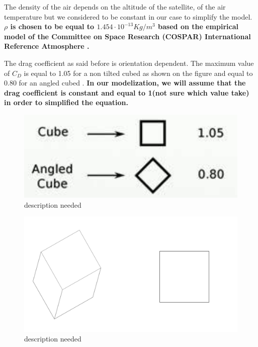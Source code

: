 The density of the air depends on the altitude of the satellite, of the air temperature but we considered to be constant in our case to simplify the model.\textbf{ $\rho$ is chosen to be equal to $1.454 \cdot 10^{-13} Kg/{m^3}$ based on the  empirical model of the Committee on Space Research (COSPAR) International Reference Atmosphere \cite{SADC}.}

The drag coefficient as said before is orientation dependent. The maximum value of $C_D$ is equal to 1.05 for a non tilted cubed as shown on the figure  and equal to 0.80 for an angled cubed \cite{wik}. \textbf{In our modelization, we will assume that the drag coefficient is constant and equal to 1(not sure which value take) in order to simplified the equation. }
\begin{table}[H]
	\begin{minipage}[b]{0.49\linewidth}
		\centering
		\begin{figure}[H]
			\centering
			\includegraphics[width=0.8\linewidth]{figures/drag_coef}
			\caption{description needed}
			\label{fig:drag}
		\end{figure}
	\end{minipage}\hfill
	\begin{minipage}[b]{0.49\linewidth}
		\centering
		\begin{figure}[H]
			\centering
			\includegraphics[width=1\linewidth]{figures/a_prep}
			\caption{description needed}
			\label{fig:cub}
		\end{figure}
	\end{minipage}
\end{table}

